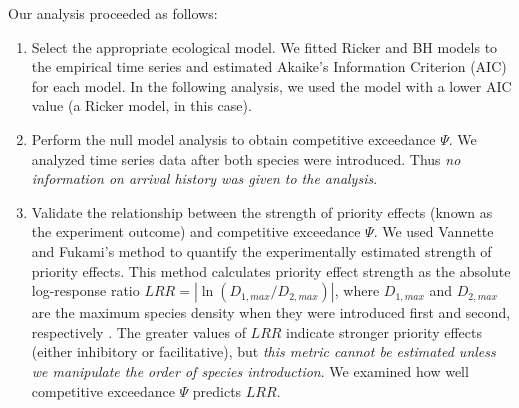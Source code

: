 \documentclass[12pt, class=article, crop=false]{standalone}
\begin{document}
Our analysis proceeded as follows:

\begin{enumerate}
    \item Select the appropriate ecological model.
    We fitted Ricker and BH models to the empirical time series and estimated Akaike's Information Criterion (AIC) \citep{burnham_model_2002} for each model.
    In the following analysis, we used the model with a lower AIC value (a Ricker model, in this case).
    \item Perform the null model analysis to obtain competitive exceedance $\Psi$.
    We analyzed time series data after both species were introduced.
    Thus \textit{no information on arrival history was given to the analysis}.
    \item Validate the relationship between the strength of priority effects (known as the experiment outcome) and competitive exceedance $\Psi$.
    We used Vannette and Fukami's method \citep{vannette_historical_2014} to quantify the experimentally estimated strength of priority effects.
    This method calculates priority effect strength as the absolute log-response ratio $LRR = |\ln (D_{1, max} / D_{2, max})|$, where $D_{1, max}$ and $D_{2, max}$ are the maximum species density when they were introduced first and second, respectively \citep{hsu_metabolic_2021}.
    The greater values of $LRR$ indicate stronger priority effects (either inhibitory or facilitative), but \textit{this metric cannot be estimated unless we manipulate the order of species introduction}.
    We examined how well competitive exceedance $\Psi$ predicts $LRR$.
\end{enumerate}
\end{document}
